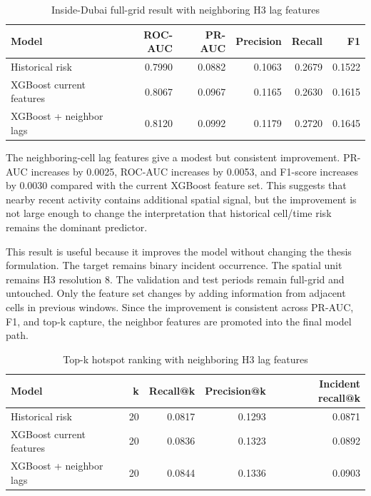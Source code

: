 \begin{table}[H]
\centering
\caption{Inside-Dubai full-grid result with neighboring H3 lag features}
\label{tab:neighbor_lag_feature_metrics}
\small
\begin{tabular}{lrrrrr}
\toprule
\textbf{Model} & \textbf{ROC-AUC} & \textbf{PR-AUC} & \textbf{Precision} & \textbf{Recall} & \textbf{F1} \\
\midrule
Historical risk & 0.7990 & 0.0882 & 0.1063 & 0.2679 & 0.1522 \\
XGBoost current features & 0.8067 & 0.0967 & 0.1165 & 0.2630 & 0.1615 \\
XGBoost + neighbor lags & 0.8120 & 0.0992 & 0.1179 & 0.2720 & 0.1645 \\
\bottomrule
\end{tabular}
\end{table}

The neighboring-cell lag features give a modest but consistent improvement. PR-AUC increases by 0.0025, ROC-AUC increases by 0.0053, and F1-score increases by 0.0030 compared with the current XGBoost feature set. This suggests that nearby recent activity contains additional spatial signal, but the improvement is not large enough to change the interpretation that historical cell/time risk remains the dominant predictor.

This result is useful because it improves the model without changing the thesis formulation. The target remains binary incident occurrence. The spatial unit remains H3 resolution 8. The validation and test periods remain full-grid and untouched. Only the feature set changes by adding information from adjacent cells in previous windows. Since the improvement is consistent across PR-AUC, F1, and top-k capture, the neighbor features are promoted into the final model path.

\begin{table}[H]
\centering
\caption{Top-k hotspot ranking with neighboring H3 lag features}
\label{tab:neighbor_lag_feature_topk}
\small
\begin{tabular}{lrrrr}
\toprule
\textbf{Model} & \textbf{k} & \textbf{Recall@k} & \textbf{Precision@k} & \textbf{Incident recall@k} \\
\midrule
Historical risk & 20 & 0.0817 & 0.1293 & 0.0871 \\
XGBoost current features & 20 & 0.0836 & 0.1323 & 0.0892 \\
XGBoost + neighbor lags & 20 & 0.0844 & 0.1336 & 0.0903 \\
\bottomrule
\end{tabular}
\end{table}

